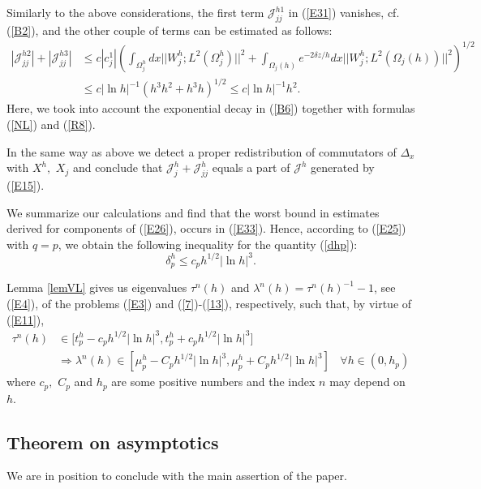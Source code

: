 \documentclass[11pt]{article}%
\numberwithin{equation}{section}
\begin{document}
Similarly to the above considerations, the first term $\mathcal{J}_{jj}^{h1}$
in (\ref{E31}) vanishes, cf. (\ref{B2}), and the other couple of terms can be
estimated as follows:%
\begin{align*}
|\mathcal{J}_{jj}^{h2}|+|\mathcal{J}_{jj}^{h3}|  &  \leq c|c_{j}^{1}|\left(
\int_{\Omega_{j}^{h}}dx||W_{j}^{h};L^{2}(\Omega_{j}^{h})||^{2}+\int
_{\Omega_{j}(h)}e^{-2\delta z/h}dx||W_{j}^{h};L^{2}(\Omega_{j}(h))||^{2}%
\right)  ^{1/2}\\
&  \leq c|\ln h|^{-1}(h^{3}h^{2}+h^{3}h)^{1/2}\leq c|\ln h|^{-1}h^{2}.
\end{align*}
Here, we took into account the exponential decay in (\ref{B6}) together with
formulas (\ref{NL}) and (\ref{R8}).

In the same way as above we detect a proper redistribution of commutators of
$\Delta_{x}$ with $X^{h},$ $X_{j}$ and conclude that $\mathcal{J}_{j}%
^{h}+\mathcal{J}_{jj}^{h}$ equals a part of $\mathcal{J}^{h}$ generated by
(\ref{E15}).

We summarize our calculations and find that the worst bound in estimates
derived for components of (\ref{E26}), occurs in (\ref{E33}). Hence, according
to (\ref{E25}) with $q=p$, we obtain the following inequality for the quantity
(\ref{dhp}):%
\[
\delta_{p}^{h}\leq c_{p}h^{1/2}|\ln h|^{3}.
\]


Lemma \ref{lemVL} gives us eigenvalues $\tau^{n}(h)$ and $\lambda^{n}%
(h)=\tau^{n}(h)^{-1}-1$, see (\ref{E4}), of the problems (\ref{E3}) and
(\ref{7})-(\ref{13}), respectively, such that, by virtue of (\ref{E11}),%
\begin{align}
\tau^{n}(h)  &  \in\lbrack t_{p}^{h}-c_{p}h^{1/2}|\ln h|^{3},t_{p}^{h}%
+c_{p}h^{1/2}|\ln h|^{3}]\label{Z1}\\
&  \Rightarrow\lambda^{n}(h)\in\left[  \mu_{p}^{h}-C_{p}h^{1/2}|\ln h|^{3}%
,\mu_{p}^{h}+C_{p}h^{1/2}|\ln h|^{3}\right]  \ \ \ \ \forall h\in
(0,h_{p})\nonumber
\end{align}
where $c_{p},$ $C_{p}$ and $h_{p}$ are some positive numbers and the index $n$
may depend on $h$.

\subsection{Theorem on asymptotics\label{sect4.5}}

We are in position to conclude with the main assertion of the paper.
\end{document}
